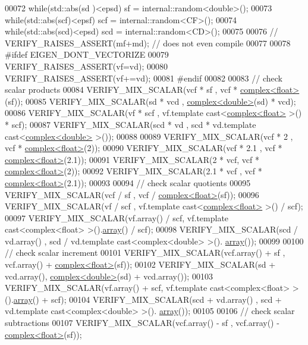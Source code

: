\begin{DoxyCode}
00072   \textcolor{keywordflow}{while}(std::abs(sd )<epsd) sf  = internal::random<double>();
00073   \textcolor{keywordflow}{while}(std::abs(scf)<epsf) scf = internal::random<CF>();
00074   \textcolor{keywordflow}{while}(std::abs(scd)<epsd) scd = internal::random<CD>();
00075 
00076 \textcolor{comment}{//   VERIFY\_RAISES\_ASSERT(mf+md); // does not even compile}
00077 
00078 \textcolor{preprocessor}{#ifdef EIGEN\_DONT\_VECTORIZE}
00079   VERIFY\_RAISES\_ASSERT(vf=vd);
00080   VERIFY\_RAISES\_ASSERT(vf+=vd);
00081 \textcolor{preprocessor}{#endif}
00082   
00083   \textcolor{comment}{// check scalar products}
00084   VERIFY\_MIX\_SCALAR(vcf * sf , vcf * \hyperlink{structcomplex}{complex<float>}(sf));
00085   VERIFY\_MIX\_SCALAR(sd * vcd , \hyperlink{structcomplex}{complex<double>}(sd) * vcd);
00086   VERIFY\_MIX\_SCALAR(vf * scf , vf.template cast<\hyperlink{structcomplex}{complex<float>} >() * scf);
00087   VERIFY\_MIX\_SCALAR(scd * vd , scd * vd.template cast<\hyperlink{structcomplex}{complex<double>} >());
00088 
00089   VERIFY\_MIX\_SCALAR(vcf * 2 , vcf * \hyperlink{structcomplex}{complex<float>}(2));
00090   VERIFY\_MIX\_SCALAR(vcf * 2.1 , vcf * \hyperlink{structcomplex}{complex<float>}(2.1));
00091   VERIFY\_MIX\_SCALAR(2 * vcf, vcf * \hyperlink{structcomplex}{complex<float>}(2));
00092   VERIFY\_MIX\_SCALAR(2.1 * vcf , vcf * \hyperlink{structcomplex}{complex<float>}(2.1));
00093 
00094   \textcolor{comment}{// check scalar quotients}
00095   VERIFY\_MIX\_SCALAR(vcf / sf , vcf / \hyperlink{structcomplex}{complex<float>}(sf));
00096   VERIFY\_MIX\_SCALAR(vf / scf , vf.template cast<\hyperlink{structcomplex}{complex<float>} >() / scf);
00097   VERIFY\_MIX\_SCALAR(vf.array()  / scf, vf.template cast<complex<float> >().\hyperlink{class_eigen_1_1array}{array}() / scf);
00098   VERIFY\_MIX\_SCALAR(scd / vd.array() , scd / vd.template cast<complex<double> >().
      \hyperlink{class_eigen_1_1array}{array}());
00099 
00100   \textcolor{comment}{// check scalar increment}
00101   VERIFY\_MIX\_SCALAR(vcf.array() + sf , vcf.array() + \hyperlink{structcomplex}{complex<float>}(sf));
00102   VERIFY\_MIX\_SCALAR(sd  + vcd.array(), \hyperlink{structcomplex}{complex<double>}(sd) + vcd.array());
00103   VERIFY\_MIX\_SCALAR(vf.array()  + scf, vf.template cast<complex<float> >().\hyperlink{class_eigen_1_1array}{array}() + scf);
00104   VERIFY\_MIX\_SCALAR(scd + vd.array() , scd + vd.template cast<complex<double> >().
      \hyperlink{class_eigen_1_1array}{array}());
00105 
00106   \textcolor{comment}{// check scalar subtractions}
00107   VERIFY\_MIX\_SCALAR(vcf.array() - sf , vcf.array() - \hyperlink{structcomplex}{complex<float>}(sf));

\end{DoxyCode}
